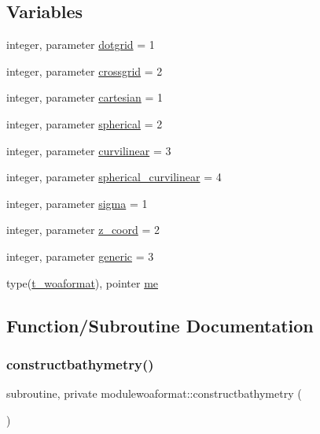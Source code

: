 \subsection*{Variables}
\begin{DoxyCompactItemize}
\item 
integer, parameter \mbox{\hyperlink{namespacemodulewoaformat_a70ceb806b6dbf5c8906fd09acbae0cba}{dotgrid}} = 1
\item 
integer, parameter \mbox{\hyperlink{namespacemodulewoaformat_a52d7e1d75349b1ff55f1e87ceeb9448d}{crossgrid}} = 2
\item 
integer, parameter \mbox{\hyperlink{namespacemodulewoaformat_af19bc667cadaffe97caf9561001439d5}{cartesian}} = 1
\item 
integer, parameter \mbox{\hyperlink{namespacemodulewoaformat_a019b0d25c27d95c27163eeccbe2f7faf}{spherical}} = 2
\item 
integer, parameter \mbox{\hyperlink{namespacemodulewoaformat_aa3bf5d769ef79cef59697177bcba35c4}{curvilinear}} = 3
\item 
integer, parameter \mbox{\hyperlink{namespacemodulewoaformat_aafcf1dec3bf62c485292e8e3bc9e76de}{spherical\+\_\+curvilinear}} = 4
\item 
integer, parameter \mbox{\hyperlink{namespacemodulewoaformat_ac9b1824fbce52f7e6f2d51388f7863f1}{sigma}} = 1
\item 
integer, parameter \mbox{\hyperlink{namespacemodulewoaformat_aecd16c0890bb293e0341eddde87f5025}{z\+\_\+coord}} = 2
\item 
integer, parameter \mbox{\hyperlink{namespacemodulewoaformat_a01662486998b5c372888306235b00073}{generic}} = 3
\item 
type(\mbox{\hyperlink{structmodulewoaformat_1_1t__woaformat}{t\+\_\+woaformat}}), pointer \mbox{\hyperlink{namespacemodulewoaformat_aa749739ae74edf849539a045da8223e0}{me}}
\end{DoxyCompactItemize}


\subsection{Function/\+Subroutine Documentation}
\mbox{\label{namespacemodulewoaformat_add300745a920cfd269052d32ca0ccfc7}} 
\subsubsection{\texorpdfstring{constructbathymetry()}{constructbathymetry()}}
{\footnotesize\ttfamily subroutine, private modulewoaformat\+::constructbathymetry (\begin{DoxyParamCaption}{ }\end{DoxyParamCaption})\hspace{0.3cm}{\ttfamily [private]}}

